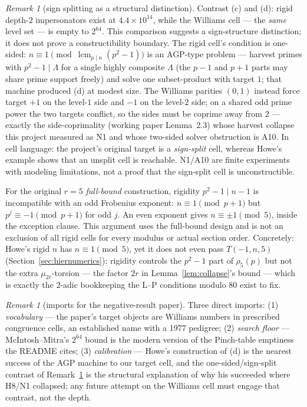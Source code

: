 \documentclass[11pt]{article}
\theoremstyle{remark}
\newtheorem{remark}[theorem]{Remark}
\DeclareMathOperator{\lcm}{lcm}
\begin{document}
\begin{remark}[sign splitting as a structural distinction]\label{rem:signs}
Contrast (c) and (d): rigid depth-$2$ impersonators exist at
$4.4\times10^{14}$, while the Williams cell --- the \emph{same} level set
--- is empty to $2^{64}$. This comparison suggests a sign-structure distinction; it does not prove
a constructibility boundary. The rigid cell's condition is one-sided:
$n \equiv 1 \pmod{
\lcm_{p \mid n}(p^2-1)}$ is an AGP-type problem --- harvest primes with
$p^2 - 1 \mid \Lambda$ for a single highly composite $\Lambda$ (the $p-1$
and $p+1$ parts may share prime support freely) and solve one
subset-product with target $1$; that machine produced (d) at modest size.
The Williams parities $(0, 1)$ instead force target $+1$ on the level-$1$
side and $-1$ on the level-$2$ side; on a shared odd prime power the two
targets conflict, so the sides must be coprime away from $2$ --- exactly
the side-coprimality (working paper Lemma~2.3) whose harvest collapse this
project measured as N1 and whose two-sided solver obstruction is A10. In
cell language: the project's original target is a \emph{sign-split} cell, whereas Howe's example
shows that an unsplit cell is reachable. N1/A10 are finite experiments with
modeling limitations, not a proof that the sign-split cell is unconstructible.

For the original $r=5$ \emph{full-bound} construction, rigidity
$p^2-1\mid n-1$ is incompatible with an odd Frobenius exponent:
$n\equiv1\pmod{p+1}$ but $p^j\equiv-1\pmod{p+1}$ for odd $j$.
An even exponent gives $n\equiv\pm1\pmod5$, inside the exception clause.
This argument uses the full-bound design and is not an exclusion of all
rigid cells for every modulus or actual section order. Concretely: Howe's rigid $n$ has
$n \equiv 1 \pmod 5$, yet it does not even pass $T(-1,n,5)$
(Section~\ref{sec:hiernumerics}): rigidity controls the $p^2-1$ part of
$\rho_5(p)$ but not the extra $\mu_{2r}$-torsion --- the factor $2r$ in
Lemma~\ref{lem:collapse}'s bound --- which is exactly the $2$-adic
bookkeeping the L--P conditions modulo $80$ exist to fix.
\end{remark}

\begin{remark}[imports for the negative-result paper]\label{rem:imports}
Three direct imports: (1) \emph{vocabulary} --- the paper's target objects
are Williams numbers in prescribed congruence cells, an established name
with a 1977 pedigree; (2) \emph{search floor} --- McIntosh--Mitra's
$2^{64}$ bound is the modern version of the Pinch-table emptiness the
README cites; (3) \emph{calibration} --- Howe's construction of (d) is the
nearest success of the AGP machine to our target cell, and the
one-sided/sign-split contrast of Remark~\ref{rem:signs} is the structural
explanation of why his succeeded where H8/N1 collapsed; any future attempt
on the Williams cell must engage that contrast, not the depth.
\end{remark}
\end{document}
